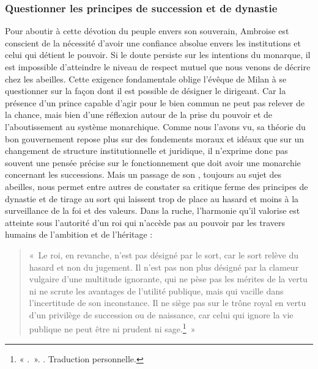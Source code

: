 \bigskip

\subsubsection{Questionner les principes de succession et de dynastie}

Pour aboutir à cette dévotion du peuple envers son souverain, Ambroise est conscient de la nécessité d'avoir une confiance absolue envers les institutions et celui qui détient le pouvoir. Si le doute persiste sur les intentions du monarque, il est impossible d'atteindre le niveau de respect mutuel que nous venons de décrire chez les abeilles. Cette exigence fondamentale oblige l'évêque de Milan à se questionner sur la façon dont il est possible de désigner le dirigeant. Car la présence d'un prince capable d'agir pour le bien commun ne peut pas relever de la chance, mais bien d'une réflexion autour de la prise du pouvoir et de l'aboutissement au système monarchique. Comme nous l'avons vu, sa théorie du bon gouvernement repose plus sur des fondements moraux et idéaux que sur un changement de structure institutionnelle et juridique, il n'exprime donc pas souvent une pensée précise sur le fonctionnement que doit avoir une monarchie concernant les successions. Mais un passage de son , toujours au sujet des abeilles, nous permet entre autres de constater sa critique ferme des principes de dynastie et de tirage au sort qui laissent trop de place au hasard et moins à la surveillance de la foi et des valeurs. Dans la ruche, l'harmonie qu'il valorise est atteinte sous l'autorité d'un roi qui n'accède pas au pouvoir par les travers humains de l'ambition et de l'héritage :

\begin{quote}
    «~Le roi, en revanche, n’est pas désigné par le sort, car le sort relève du hasard et non du jugement. Il n'est pas non plus désigné par la clameur vulgaire d'une multitude ignorante, qui ne pèse pas les mérites de la vertu ni ne scrute les avantages de l'utilité publique, mais qui vacille dans l'incertitude de son inconstance. Il ne siège pas sur le trône royal en vertu d’un privilège de succession ou de naissance, car celui qui ignore la vie publique ne peut être ni prudent ni sage.\footnote{« .~». \cite[\nopp V, 21, 68]{ambroise_csel_32_1}. Traduction personnelle.}~»
\end{quote}

